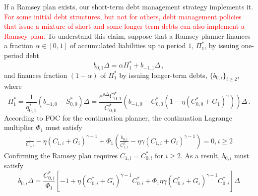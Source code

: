 \documentclass[12pt]{article}
\newcommand{\WJ}[1]{{\textcolor{red}{#1}}}
\begin{document}
If a Ramsey plan exists, our  short-term debt management strategy  implements  it. %
\WJ{ For some initial debt structures,  but not for others,   debt management policies that issue a mixture of  short and some  longer term debts can also implement a Ramsey plan. }  
To understand this claim,  suppose that a Ramsey planner  finances a fraction $\alpha\in [0, 1]$ of accumulated  liabilities  up to period $1$, $\Pi_1^*$, by issuing one-period debt %
\begin{equation} \label{b01_n1}
	b_{0, 1}\Delta = \alpha \Pi_1^*+b_{-1, 1}\Delta\, , 
\end{equation}
  and  finances   fraction $(1-\alpha)$ of $\Pi_1^*$ by issuing longer-term debts, $\{b_{0, i}\}_{i\geq 2}$, where
\begin{equation} \label{Pistar1}
\Pi_1^* = \frac{1}{q_{0, 1}^*} \left(b_{-1, 0}-S_{0, 0}^*\right)\Delta  = \frac{e^{\rho \Delta}C_{0, 1}^*}{C_{0, 0}^*}\left(b_{-1, 0}-C_{0, 0}^*\left( 1-\eta(C_{0, 0}^*+G_1)^\gamma\right) \right)\Delta  \,.
\end{equation}    
According to FOC for the continuation planner, the continuation Lagrange multiplier $\Phi_1$ must satisfy
\begin{align*}
	\frac{1}{C_{1, i}} -\eta (C_{1, i}+G_i)^{\gamma-1} +\Phi_1\left( \frac{b_{0, i}}{C_{1, i}^2} -\eta \gamma(C_{1, i}+G_i)^{\gamma-1} \right) =0, i\geq 2
\end{align*}
Confirming the Ramsey plan requires $C_{1, i}=C_{0, i}^*$ for $i\geq 2$. As a result, $b_{0, i}$ must satisfy
\begin{equation}\label{b0i_n1}
b_{0, i}\Delta = \frac{C_{0, i}^*}{\Phi_1} \left[ -1+\eta \left( C_{0, i}^* + G_i  \right)^{\gamma-1}C_{0, i}^* + \Phi_1 \eta \gamma \left( C_{0, i}^* + G_i  \right)^{\gamma-1}C_{0, i}^*  \right]\Delta
\end{equation}

\end{document}
